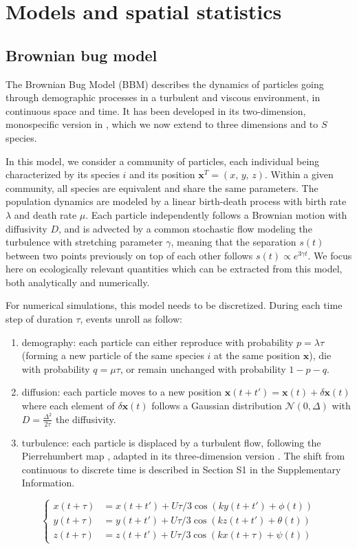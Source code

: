 \documentclass[english]{article}
\begin{document}
\section*{Models and spatial statistics}

\subsection*{Brownian bug model}

The Brownian Bug Model (BBM) describes the dynamics of particles going
through demographic processes in a turbulent and viscous environment,
in continuous space and time. It has been developed in its two-dimension,
monospecific version in \citet{young_reproductive_2001}, which we
now extend to three dimensions and to $S$ species.

In this model, we consider a community of particles, each individual
being characterized by its species $i$ and its position $\mathbf{x}^{T}=(x,\,y,\,z)$.
Within a given community, all species are equivalent and share the
same parameters. The population dynamics are modeled by a linear birth-death
process with birth rate $\lambda$ and death rate $\mu$. Each particle
independently follows a Brownian motion with diffusivity $D$, and
is advected by a common stochastic flow modeling the turbulence with
stretching parameter $\gamma$, meaning that the separation $s(t)$
between two points previously on top of each other follows $s(t)\varpropto e^{3\gamma t}$.
We focus here on ecologically relevant quantities which can be extracted
from this model, both analytically and numerically. 

For numerical simulations, this model needs to be discretized. During
each time step of duration $\tau$, events unroll as follow:
\begin{enumerate}
\item demography: each particle can either reproduce with probability $p=\lambda\tau$
(forming a new particle of the same species $i$ at the same position
$\mathbf{x}$), die with probability $q=\mu\tau$, or remain unchanged
with probability $1-p-q$.
\item diffusion: each particle moves to a new position $\mathbf{x}(t+t')=\mathbf{x}(t)+\delta\mathbf{x}(t)$
where each element of $\delta\mathbf{x}(t)$ follows a Gaussian distribution
$\mathcal{N}(0,\Delta)$ with $D=\frac{\Delta^{2}}{2\tau}$ the diffusivity. 
\item turbulence: each particle is displaced by a turbulent flow, following
the Pierrehumbert map \citep{pierrehumbert_tracer_1994}, adapted
in its three-dimension version \citep{ngan_scalar_2011}. The shift
from continuous to discrete time is described in Section S1 in the
Supplementary Information.
\end{enumerate}
\[
\begin{cases}
x(t+\tau) & =x(t+t')+U\tau/3\cos\left(ky(t+t')+\phi(t)\right)\\
y(t+\tau) & =y(t+t')+U\tau/3\cos\left(kz(t+t')+\theta(t)\right)\\
z(t+\tau) & =z(t+t')+U\tau/3\cos\left(kx(t+\tau)+\psi(t)\right)
\end{cases}
\]
\end{document}
